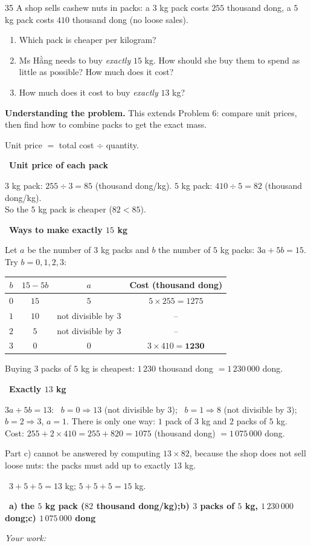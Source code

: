 \documentclass[11pt]{article}
\newif\ifsol \solfalse
\providecommand{\AnsWord}{Đáp số}
\newcommand{\ans}[1]{\par\smallskip{\bfseries\color{tmGreen!88!black}\AnsWord:}\ {\bfseries\color{AnsRed}#1}\par}
\newcommand{\probsol}[1]{%
  \begin{lrbox}{\solmeasure}\begin{minipage}{\dimexpr\linewidth-24pt\relax}#1\end{minipage}\end{lrbox}%
  \ifsol
    \begin{solbox}#1\end{solbox}%
  \else
    \setlength{\solht}{\dimexpr\ht\solmeasure+\dp\solmeasure+0.85cm\relax}%
    \ifdim\solht<1.35cm\setlength{\solht}{1.35cm}\fi
    \ifdim\solht>\StudentMaxWork\setlength{\solht}{\StudentMaxWork}\fi
    \begin{tcolorbox}[colback=white,colframe=Line,boxrule=0.8pt,arc=5pt,
      left=8pt,right=8pt,top=4pt,bottom=4pt,height=\solht]{\footnotesize\color{Slate}\itshape\WorkWord}\end{tcolorbox}%
  \fi}
\newlength{\StudentMaxWork}\setlength{\StudentMaxWork}{7.5cm}
\newcommand{\step}[2]{\par\smallskip\noindent{\bfseries\color{tmBlue!85!black}\StepWord~#1.}\ {\bfseries #2}\par\nopagebreak}
\newcommand{\verify}[1]{\par\smallskip\noindent{\bfseries\color{tmGreen!80!black}\faCheckCircle\ \CheckWord}\ #1\par}
\def\WorkWord{Your work:}
\def\AnsWord{Answer}
\def\StepWord{Step}
\def\CheckWord{Check:}
\begin{document}
\begin{probbox}{35}{\relax}
A shop sells cashew nuts in packs: a $3$ kg pack costs $255$ thousand dong, a $5$ kg pack costs $410$ thousand dong (no loose sales).
\begin{enumerate}[label=\alph*),leftmargin=1.6em,itemsep=0pt,topsep=2pt]
  \item Which pack is cheaper per kilogram?
  \item Ms Hằng needs to buy \emph{exactly} $15$ kg. How should she buy them to spend as little as possible? How much does it cost?
  \item How much does it cost to buy \emph{exactly} $13$ kg?
\end{enumerate}
\end{probbox}
\probsol{
\textbf{Understanding the problem.} This extends Problem 6: compare unit prices, then find how to combine packs to get the exact mass.
\begin{recallbox}Unit price $=$ total cost $\div$ quantity.\end{recallbox}
\step{1}{Unit price of each pack}
$3$ kg pack: $255 \div 3 = 85$ (thousand dong/kg). \quad $5$ kg pack: $410 \div 5 = 82$ (thousand dong/kg).\\
So the $5$ kg pack is cheaper ($82 < 85$).
\step{2}{Ways to make exactly $15$ kg}
Let $a$ be the number of $3$ kg packs and $b$ the number of $5$ kg packs: $3a + 5b = 15$. Try $b = 0, 1, 2, 3$:
\begin{center}
\begin{tabular}{|c|c|c|c|}
\hline
\rowcolor{tmBlue!10} $b$ & $15 - 5b$ & $a$ & Cost (thousand dong)\\ \hline
$0$ & $15$ & $5$ & $5\times 255 = 1275$\\ \hline
$1$ & $10$ & not divisible by $3$ & --\\ \hline
$2$ & $5$ & not divisible by $3$ & --\\ \hline
$3$ & $0$ & $0$ & $3\times 410 = \mathbf{1230}$\\ \hline
\end{tabular}
\end{center}
Buying $3$ packs of $5$ kg is cheapest: $1\,230$ thousand dong $= 1\,230\,000$ dong.
\step{3}{Exactly $13$ kg}
$3a + 5b = 13$: \ $b = 0 \Rightarrow 13$ (not divisible by $3$); \ $b = 1 \Rightarrow 8$ (not divisible by $3$);
\ $b = 2 \Rightarrow 3$, $a = 1$. There is only one way: $1$ pack of $3$ kg and $2$ packs of $5$ kg.\\
Cost: $255 + 2\times 410 = 255 + 820 = 1075$ (thousand dong) $= 1\,075\,000$ dong.
\begin{warnbox}Part c) cannot be answered by computing $13\times 82$, because the shop does not sell loose nuts: the packs
must add up to exactly $13$ kg.\end{warnbox}
\verify{$3 + 5 + 5 = 13$ kg; $5 + 5 + 5 = 15$ kg.}
\ans{a) the $5$ kg pack ($82$ thousand dong/kg);\quad b) $3$ packs of $5$ kg, $1\,230\,000$ dong;\quad c) $1\,075\,000$ dong}
}
\end{document}
